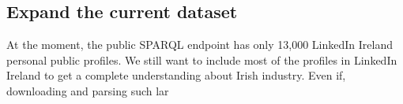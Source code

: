 \subsection{Expand the current dataset}
At the moment, the public SPARQL endpoint has only 13,000 LinkedIn Ireland personal public profiles. We still want to include most of the profiles in LinkedIn Ireland to get a complete understanding about Irish industry. Even if, downloading and parsing such lar